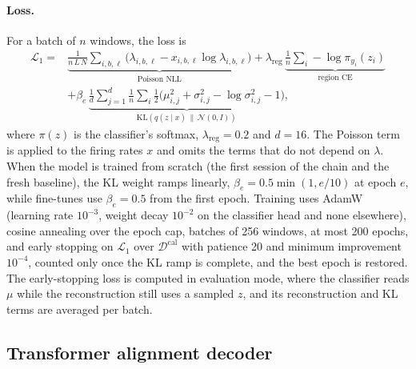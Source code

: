 \documentclass{article}
\begin{document}
\paragraph{Loss.} For a batch of $n$ windows, the loss is
\begin{equation}
  \begin{split}
  \mathcal{L}_1={}&\underbrace{\frac{1}{n\,L\,N}\sum_{i,b,\ell}\big(\lambda_{i,b,\ell}-x_{i,b,\ell}\log\lambda_{i,b,\ell}\big)}_{\text{Poisson NLL}}
  +\lambda_{\mathrm{reg}}\,\underbrace{\frac1n\sum_i -\log \pi_{y_i}(z_i)}_{\text{region CE}}\\
  &+\beta_e\,\underbrace{\frac{1}{d}\sum_{j=1}^{d}\frac1n\sum_i \tfrac12\big(\mu_{i,j}^2+\sigma_{i,j}^2-\log\sigma_{i,j}^2-1\big)}_{\mathrm{KL}(q(z\mid x)\,\|\,\mathcal{N}(0,I))},
  \end{split}
\end{equation}
where $\pi(z)$ is the classifier's softmax, $\lambda_{\mathrm{reg}}=0.2$ and $d=16$. The Poisson term is applied to the firing rates $x$ and omits the terms that do not depend on $\lambda$. When the model is trained from scratch (the first session of the chain and the fresh baseline), the KL weight ramps linearly, $\beta_e=0.5\min(1,e/10)$ at epoch $e$, while fine-tunes use $\beta_e=0.5$ from the first epoch. Training uses AdamW (learning rate $10^{-3}$, weight decay $10^{-2}$ on the classifier head and none elsewhere), cosine annealing over the epoch cap, batches of 256 windows, at most 200 epochs, and early stopping on $\mathcal{L}_1$ over $\mathcal{D}^{\mathrm{cal}}$ with patience 20 and minimum improvement $10^{-4}$, counted only once the KL ramp is complete, and the best epoch is restored. The early-stopping loss is computed in evaluation mode, where the classifier reads $\mu$ while the reconstruction still uses a sampled $z$, and its reconstruction and KL terms are averaged per batch.

\subsection{Transformer alignment decoder}
\end{document}
